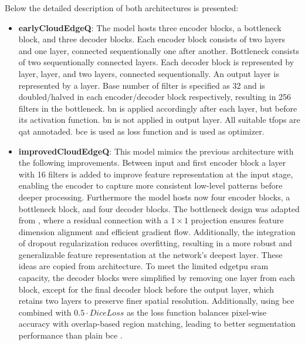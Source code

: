 {Below the detailed description of both architectures is presented:
\begin{itemize}
    \item \textbf{earlyCloudEdgeQ}: The model hosts three encoder blocks, a bottleneck block, and three decoder blocks.
    Each encoder block consists of two  layers and one  layer,
    connected sequentionally one after another. Bottleneck consists of two sequentionally connected  layers.
    Each decoder block is represented by  layer,  layer, and two  layers,
    connected sequentionally. An output layer is represented by a  layer.
    Base number of filter is specified as 32 and is doubled/halved in each encoder/decoder block respectively, resulting in 256 filters in the bottleneck.
    \gls{bn} is applied accordingly after each  layer, but before its activation function. \gls{bn} is not applied in output layer.
    All suitable \glspl{tfop} are \gls{qat} annotaded. \gls{bce} is used as loss function and  \cite{adam} is used as optimizer.
    \item \textbf{improvedCloudEdgeQ}: This model mimics the previous architecture with the following improvements.
    Between input and first encoder block a  layer with 16 filters is added to improve feature representation at the input stage,
    enabling the encoder to capture more consistent low-level patterns before deeper processing.
    Furthermore the model hosts now four encoder blocks, a bottleneck block, and four decoder blocks. The bottleneck design was adapted from ,
    where a residual connection with a $1\times1$ projection ensures feature dimension alignment and efficient gradient flow. Additionally,
    the integration of dropout regularization reduces overfitting, resulting in a more robust and generalizable feature representation at the network's deepest layer.
    These ideas are copied from  architecture.
    To meet the limited \gls{edgetpu} \gls{sram} capacity, the decoder blocks were simplified by removing one  layer from each block,
    except for the final decoder block before the output layer, which retains two  layers to preserve finer spatial resolution.
    Additionally, using \gls{bce} combined with \ensuremath{0.5 \cdot DiceLoss} as the loss function balances pixel-wise accuracy with overlap-based region matching,
    leading to better segmentation performance than plain \gls{bce} \cite{bcedice1, bcedice2}.


\end{itemize}}
